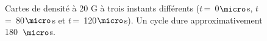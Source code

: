 \begin{refsection}
\begin{figure}[htb]
  \centering
    \caption{Cartes de densité à 20 G à trois instants
    différents ($t\,$=~0$\micro$s,
    $t\,$=~80$\micro$s et $t\,$=~120$\micro$s). Un cycle dure approximativement
    180~$\micro$s.}
    \label{4-CybeleVarMag-2}
\end{figure}


\end{refsection}

